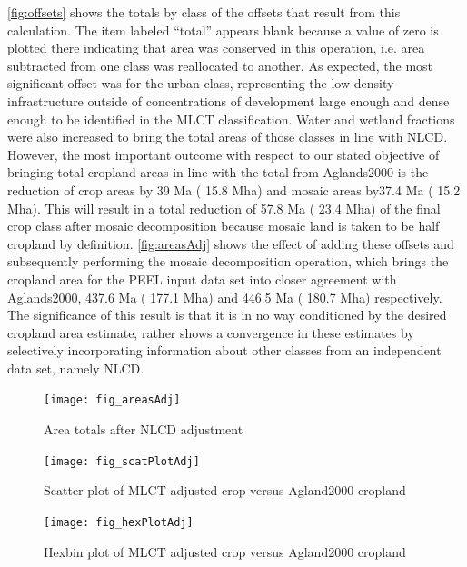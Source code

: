 \autoref{fig:offsets} shows the totals by class of the offsets that
result from this calculation.  The item labeled ``total'' appears
blank because a value of zero is plotted there indicating that area
was conserved in this operation, i.e. area subtracted from one class
was reallocated to another.  As expected, the most significant offset
was for the urban class, representing the low-density infrastructure
outside of concentrations of development large enough and dense enough
to be identified in the MLCT classification.  Water and wetland
fractions were also increased to bring the total areas of those
classes in line with NLCD.  However, the most important outcome with
respect to our stated objective of bringing total cropland areas in
line with the total from Aglands2000 is the reduction of crop areas by
39 Ma ( 15.8 Mha) and mosaic areas
by37.4 Ma ( 15.2 Mha).  This will
result in a total reduction of
57.8 Ma ( 23.4 Mha)
of the final crop class after mosaic decomposition because mosaic land
is taken to be half cropland by definition.  \autoref{fig:areasAdj}
shows the effect of adding these offsets and subsequently performing
the mosaic decomposition operation, which brings the cropland area for
the PEEL input data set into closer agreement with Aglands2000,
437.6 Ma ( 177.1 Mha) and
446.5 Ma ( 180.7 Mha) respectively. The
significance of this result is that it is in no way conditioned by the
desired cropland area estimate, rather shows a convergence in these
estimates by selectively incorporating information about other classes
from an independent data set, namely NLCD.

\begin{figure}[hpt]
  \centering


  \texttt{[image: fig\_areasAdj]}
  \caption{Area totals after NLCD adjustment}
  \label{fig:areasAdj}
\end{figure}

\begin{figure}[hpt] 
  \centering

    \texttt{[image: fig\_scatPlotAdj]}
  \caption{Scatter plot of MLCT adjusted crop versus Agland2000 cropland}
  \label{fig:scatPlotAdj} 
\end{figure} 

\begin{figure}[hpt] 
  \centering

    \texttt{[image: fig\_hexPlotAdj]}
  \caption{Hexbin plot of MLCT adjusted crop versus Agland2000 cropland}
  \label{fig:hexPlotAdj} 
\end{figure} 


